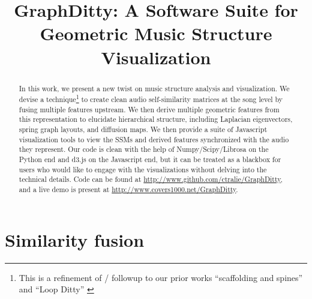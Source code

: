 \documentclass{article}
\title{GraphDitty: A Software Suite for Geometric Music Structure Visualization}
\begin{document}
%
\maketitle
%
\begin{abstract}
    In this work, we present a new twist on music structure analysis and visualization.  We devise a technique\footnote{This is a refinement of / followup to our prior works ``scaffolding and spines'' \cite{bendichgeometric} and ``Loop Ditty'' \cite{tralie2017Dissertation}} to create clean audio self-similarity matrices at the song level by fusing multiple features upstream.  We then derive multiple geometric features from this representation to elucidate hierarchical structure, including Laplacian eigenvectors, spring graph layouts, and diffusion maps.  We then provide a suite of Javascript visualization tools to view the SSMs and derived features synchronized with the audio they represent.  Our code is clean with the help of Numpy/Scipy/Librosa on the Python end and d3.js on the Javascript end, but it can be treated as a blackbox for users who would like to engage with the visualizations without delving into the technical details.  Code can be found at \url{http://www.github.com/ctralie/GraphDitty}, and a live demo is present at \url{http://www.covers1000.net/GraphDitty}.
\end{abstract}


\section{Similarity fusion}\label{sec:fusion}
\end{document}
